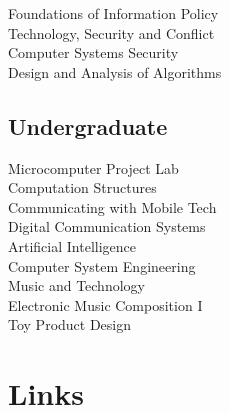 \documentclass[letterpaper]{deedy-resume} %
\begin{document}
\begin{minipage}[t]{0.33\textwidth}
Foundations of Information Policy \\  %
Technology, Security and Conflict \\  %
Computer Systems Security \\          %
Design and Analysis of Algorithms \\  %

\sectionspace %


\subsection{Undergraduate}

Microcomputer Project Lab \\          %
Computation Structures \\             %
Communicating with Mobile Tech \\     %
Digital Communication Systems \\      %
Artificial Intelligence \\            %
Computer System Engineering \\        %
Music and Technology \\               %
Electronic Music Composition I \\     %
Toy Product Design                    %

\sectionspace %


\section{Links}


\end{minipage}
\end{document}
